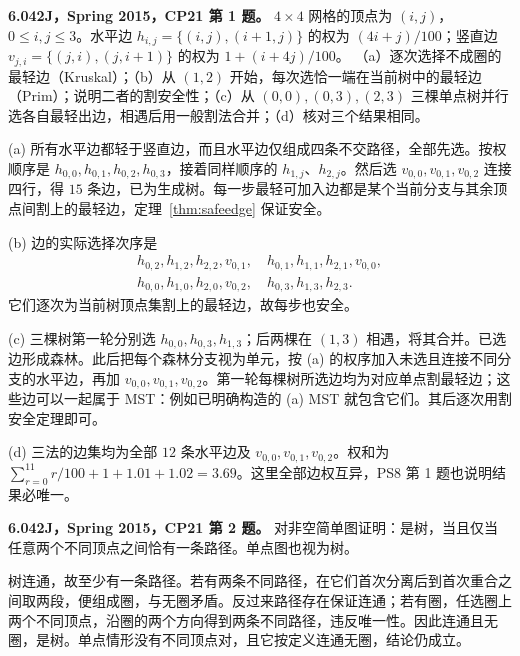 \begin{exercise}\label{mit:6042-cp21-q1}
\textbf{6.042J，Spring 2015，CP21 第 1 题。}
$4\times4$ 网格的顶点为 $(i,j)$，$0\le i,j\le3$。水平边 $h_{i,j}=\{(i,j),(i+1,j)\}$ 的权为 $(4i+j)/100$；竖直边 $v_{j,i}=\{(j,i),(j,i+1)\}$ 的权为 $1+(i+4j)/100$。
（a）逐次选择不成圈的最轻边（Kruskal）；（b）从 $(1,2)$ 开始，每次选恰一端在当前树中的最轻边（Prim）；说明二者的割安全性；（c）从 $(0,0),(0,3),(2,3)$ 三棵单点树并行选各自最轻出边，相遇后用一般割法合并；（d）核对三个结果相同。
\end{exercise}
\begin{solution}
(a) 所有水平边都轻于竖直边，而且水平边仅组成四条不交路径，全部先选。按权顺序是 $h_{0,0},h_{0,1},h_{0,2},h_{0,3}$，接着同样顺序的 $h_{1,j}$、$h_{2,j}$。然后选 $v_{0,0},v_{0,1},v_{0,2}$ 连接四行，得 $15$ 条边，已为生成树。每一步最轻可加入边都是某个当前分支与其余顶点间割上的最轻边，定理~\ref{thm:safeedge} 保证安全。

(b) 边的实际选择次序是
\[
\begin{gathered}
h_{0,2},h_{1,2},h_{2,2},v_{0,1},\quad
h_{0,1},h_{1,1},h_{2,1},v_{0,0},\\
h_{0,0},h_{1,0},h_{2,0},v_{0,2},\quad h_{0,3},h_{1,3},h_{2,3}.
\end{gathered}
\]
它们逐次为当前树顶点集割上的最轻边，故每步也安全。

(c) 三棵树第一轮分别选 $h_{0,0},h_{0,3},h_{1,3}$；后两棵在 $(1,3)$ 相遇，将其合并。已选边形成森林。此后把每个森林分支视为单元，按 (a) 的权序加入未选且连接不同分支的水平边，再加 $v_{0,0},v_{0,1},v_{0,2}$。第一轮每棵树所选边均为对应单点割最轻边；这些边可以一起属于 MST：例如已明确构造的 (a) MST 就包含它们。其后逐次用割安全定理即可。

(d) 三法的边集均为全部 $12$ 条水平边及 $v_{0,0},v_{0,1},v_{0,2}$。权和为 $\sum_{r=0}^{11}r/100+1+1.01+1.02=3.69$。这里全部边权互异，PS8 第 1 题也说明结果必唯一。
\end{solution}

\begin{exercise}\label{mit:6042-cp21-q2}
\textbf{6.042J，Spring 2015，CP21 第 2 题。}
对非空简单图证明：是树，当且仅当任意两个不同顶点之间恰有一条路径。单点图也视为树。
\end{exercise}
\begin{solution}
树连通，故至少有一条路径。若有两条不同路径，在它们首次分离后到首次重合之间取两段，便组成圈，与无圈矛盾。反过来路径存在保证连通；若有圈，任选圈上两个不同顶点，沿圈的两个方向得到两条不同路径，违反唯一性。因此连通且无圈，是树。单点情形没有不同顶点对，且它按定义连通无圈，结论仍成立。
\end{solution}

